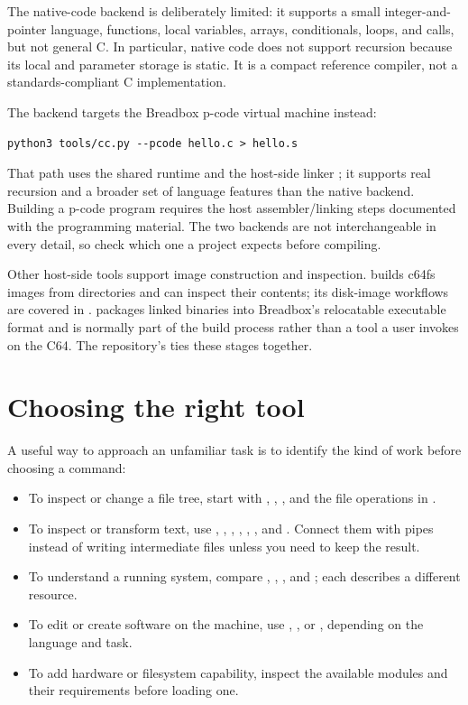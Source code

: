 The native-code backend is deliberately limited: it supports a small integer-and-pointer language, functions, local variables, arrays, conditionals, loops, and calls, but not general C. In particular, native code does not support recursion because its local and parameter storage is static. It is a compact reference compiler, not a standards-compliant C implementation.

The  backend targets the Breadbox p-code virtual machine instead:

\begin{lstlisting}
python3 tools/cc.py --pcode hello.c > hello.s
\end{lstlisting}

That path uses the shared  runtime and the host-side linker ; it supports real recursion and a broader set of language features than the native backend. Building a p-code program requires the host assembler/linking steps documented with the programming material. The two backends are not interchangeable in every detail, so check which one a project expects before compiling.

Other host-side tools support image construction and inspection.  builds c64fs images from directories and can inspect their contents; its disk-image workflows are covered in .  packages linked binaries into Breadbox's relocatable executable format and is normally part of the build process rather than a tool a user invokes on the C64. The repository's  ties these stages together.

\section{Choosing the right tool}

A useful way to approach an unfamiliar task is to identify the kind of work before choosing a command:

\begin{itemize}
  \item To inspect or change a file tree, start with , , , and the file operations in .
  \item To inspect or transform text, use , , , , , , and . Connect them with pipes instead of writing intermediate files unless you need to keep the result.
  \item To understand a running system, compare , , , and ; each describes a different resource.
  \item To edit or create software on the machine, use , , or , depending on the language and task.
  \item To add hardware or filesystem capability, inspect the available modules and their requirements before loading one.
\end{itemize}

